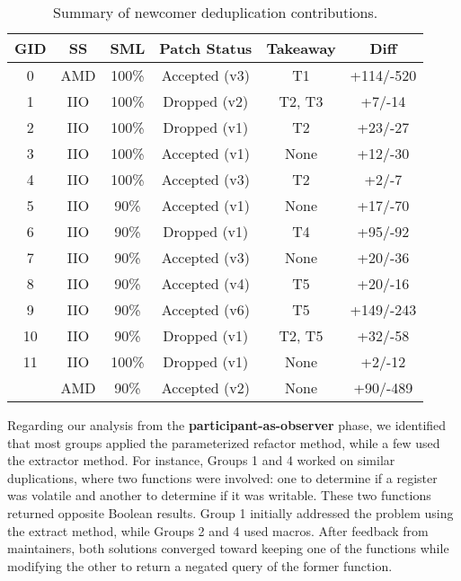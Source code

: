 \documentclass[10pt,conference]{IEEEtran}
\begin{document}
\begin{table}[ht]
\centering
\caption{Summary of newcomer deduplication contributions.}
\begin{tabular}{ |c |c |c |c |c | c| }
\hline
\textbf{GID} & \textbf{SS} & \textbf{SML} & \textbf{Patch Status} & \textbf{Takeaway} & \textbf{Diff} \\
\hline
0 & AMD & 100\% & Accepted (v3) & T1 & +114/-520 \\ \hline
1 & IIO & 100\% & Dropped (v2) & T2, T3 & +7/-14 \\ \hline
2 & IIO & 100\% & Dropped (v1) & T2 & +23/-27 \\ \hline
3 & IIO & 100\% & Accepted (v1) & None & +12/-30 \\ \hline
4 & IIO & 100\% & Accepted (v3) & T2 & +2/-7 \\ \hline
5 & IIO & 90\% & Accepted (v1) & None & +17/-70 \\ \hline
6 & IIO & 90\% & Dropped (v1) & T4 & +95/-92 \\ \hline
7 & IIO & 90\% & Accepted (v3) & None & +20/-36 \\ \hline
8 & IIO & 90\% & Accepted (v4) & T5 & +20/-16 \\ \hline
9 & IIO & 90\% & Accepted (v6) & T5 & +149/-243 \\ \hline
10 & IIO & 90\% & Dropped (v1) & T2, T5 & +32/-58 \\ \hline
11 & IIO & 100\% & Dropped (v1) & None & +2/-12 \\
   & AMD & 90\% & Accepted (v2) & None & +90/-489 \\ \hline

\end{tabular}%

\label{tab:stu}
\end{table}

Regarding our analysis from the \textbf{participant-as-observer} phase, we identified that most groups applied the parameterized refactor method, while a few used the extractor method. For instance, Groups 1 and 4 worked on similar duplications, where two functions were involved: one to determine if a register was volatile and another to determine if it was writable. These two functions returned opposite Boolean results. Group 1 initially addressed the problem using the extract method, while Groups 2 and 4 used macros. After feedback from maintainers, both solutions converged toward keeping one of the functions while modifying the other to return a negated query of the former function.
\end{document}
